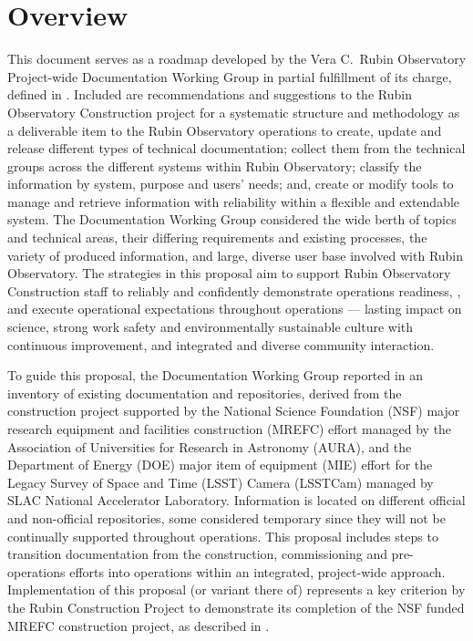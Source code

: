 \section{Overview}

This document serves as a roadmap developed by the Vera C.\ Rubin Observatory Project-wide Documentation Working Group in partial fulfillment of its charge, defined in .
Included are recommendations and suggestions to the Rubin Observatory Construction project for a systematic structure and methodology as a deliverable item to the Rubin Observatory operations to create, update and release different types of technical documentation; collect them from the technical groups across the different systems within Rubin Observatory; classify the information by system, purpose and users' needs; and, create or modify tools to manage and retrieve information with reliability within a flexible and extendable system.
The Documentation Working Group considered the wide berth of topics and technical areas, their differing requirements and existing processes, the variety of produced information, and large, diverse user base involved with Rubin Observatory.
The strategies in this proposal aim to support Rubin Observatory Construction staff to reliably and confidently demonstrate operations readiness, , and execute operational expectations throughout operations --- lasting impact on science, strong work safety and environmentally sustainable culture with continuous improvement, and integrated and diverse community interaction.

To guide this proposal, the Documentation Working Group reported in  an inventory of existing documentation and repositories, derived from the construction project supported by the National Science Foundation (NSF) major research equipment and facilities construction (MREFC) effort managed by the Association of Universities for Research in Astronomy (AURA), and the Department of Energy (DOE) major item of equipment (MIE) effort for the Legacy Survey of Space and Time (LSST) Camera (LSSTCam) managed by SLAC National Accelerator Laboratory.
Information is located on different official and non-official repositories, some considered temporary since they will not be continually supported throughout operations.
This proposal includes steps to transition documentation from the construction, commissioning and pre-operations efforts into operations within an integrated, project-wide approach.
Implementation of this proposal (or variant there of) represents a key criterion by the Rubin Construction Project to demonstrate its completion of the NSF funded MREFC construction project, as described in .

